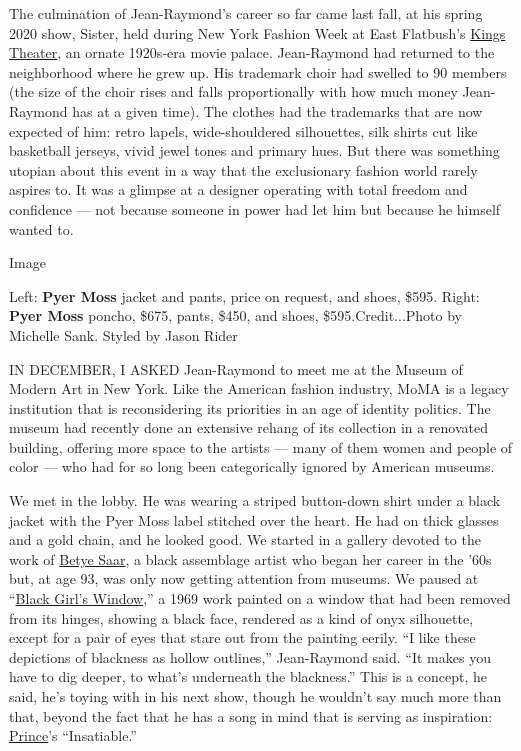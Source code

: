 The culmination of Jean-Raymond's career so far came last fall, at his
spring 2020 show, Sister, held during New York Fashion Week at East
Flatbush's
\href{https://www.nytimes3xbfgragh.onion/2014/12/31/realestate/commercial/kings-theater-in-flatbush-set-to-reopen-and-lift-a-neighborhood.html}{Kings
Theater}, an ornate 1920s-era movie palace. Jean-Raymond had returned to
the neighborhood where he grew up. His trademark choir had swelled to 90
members (the size of the choir rises and falls proportionally with how
much money Jean-Raymond has at a given time). The clothes had the
trademarks that are now expected of him: retro lapels, wide-shouldered
silhouettes, silk shirts cut like basketball jerseys, vivid jewel tones
and primary hues. But there was something utopian about this event in a
way that the exclusionary fashion world rarely aspires to. It was a
glimpse at a designer operating with total freedom and confidence ---
not because someone in power had let him but because he himself wanted
to.

Image

Left: \textbf{Pyer Moss} jacket and pants, price on request, and shoes,
\$595. Right: \textbf{Pyer Moss} poncho, \$675, pants, \$450, and shoes,
\$595.Credit...Photo by Michelle Sank. Styled by Jason Rider

IN DECEMBER, I ASKED Jean-Raymond to meet me at the Museum of Modern Art
in New York. Like the American fashion industry, MoMA is a legacy
institution that is reconsidering its priorities in an age of identity
politics. The museum had recently done an extensive rehang of its
collection in a renovated building, offering more space to the artists
--- many of them women and people of color --- who had for so long been
categorically ignored by American museums.

We met in the lobby. He was wearing a striped button-down shirt under a
black jacket with the Pyer Moss label stitched over the heart. He had on
thick glasses and a gold chain, and he looked good. We started in a
gallery devoted to the work of
\href{https://www.nytimes3xbfgragh.onion/2019/09/04/arts/design/betye-saar.html}{Betye
Saar}, a black assemblage artist who began her career in the '60s but,
at age 93, was only now getting attention from museums. We paused at
``\href{https://www.moma.org/collection/works/167631}{Black Girl's
Window},'' a 1969 work painted on a window that had been removed from
its hinges, showing a black face, rendered as a kind of onyx silhouette,
except for a pair of eyes that stare out from the painting eerily. ``I
like these depictions of blackness as hollow outlines,'' Jean-Raymond
said. ``It makes you have to dig deeper, to what's underneath the
blackness.'' This is a concept, he said, he's toying with in his next
show, though he wouldn't say much more than that, beyond the fact that
he has a song in mind that is serving as inspiration:
\href{https://www.nytimes3xbfgragh.onion/topic/person/prince}{Prince}'s
``Insatiable.''

